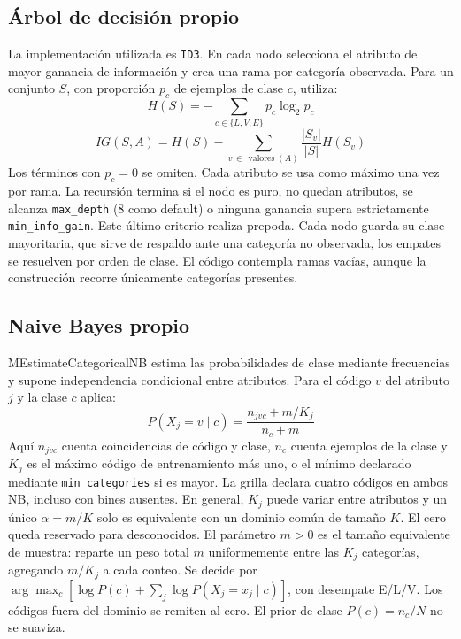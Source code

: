\documentclass[conference]{IEEEtran}
\begin{document}
\subsection{Árbol de decisión propio}
La implementación utilizada es \texttt{ID3}. En cada nodo selecciona el atributo de mayor ganancia de información y crea una rama por categoría observada. Para un conjunto $S$, con proporción $p_c$ de ejemplos de clase $c$, utiliza:
\begin{equation}
H(S) = -\sum_{c \in \{L,V,E\}} p_c \log_2 p_c
\label{eq:entropia}
\end{equation}
\begin{equation}
IG(S, A) = H(S) - \sum_{v \,\in\, \operatorname{valores}(A)} \frac{|S_v|}{|S|} H(S_v)
\label{eq:ganancia}
\end{equation}
Los términos con $p_c=0$ se omiten. Cada atributo se usa como máximo una vez por rama. La recursión termina si el nodo es puro, no quedan atributos, se alcanza \texttt{max\_depth} (8 como default) o ninguna ganancia supera estrictamente \texttt{min\_info\_gain}. Este último criterio realiza prepoda. Cada nodo guarda su clase mayoritaria, que sirve de respaldo ante una categoría no observada, los empates se resuelven por orden de clase. El código contempla ramas vacías, aunque la construcción recorre únicamente categorías presentes.

\subsection{Naive Bayes propio}
MEstimateCategoricalNB estima las probabilidades de clase mediante frecuencias y supone independencia condicional entre atributos. Para el código $v$ del atributo $j$ y la clase $c$ aplica:
\begin{equation}
P(X_j=v\mid c)=\frac{n_{jvc}+m/K_j}{n_c+m}
\label{eq:m-estimate}
\end{equation}
Aquí $n_{jvc}$ cuenta coincidencias de código y clase, $n_c$ cuenta ejemplos de la clase y $K_j$ es el máximo código de entrenamiento más uno, o el mínimo declarado mediante \texttt{min\_categories} si es mayor. La grilla declara cuatro códigos en ambos NB, incluso con bines ausentes. En general, $K_j$ puede variar entre atributos y un único $\alpha=m/K$ solo es equivalente con un dominio común de tamaño $K$. El cero queda reservado para desconocidos. El parámetro $m>0$ es el tamaño equivalente de muestra: reparte un peso total $m$ uniformemente entre las $K_j$ categorías, agregando $m/K_j$ a cada conteo. Se decide por $\arg\max_c[\log P(c)+\sum_j\log P(X_j=x_j\mid c)]$, con desempate E/L/V. Los códigos fuera del dominio se remiten al cero. El prior de clase $P(c)=n_c/N$ no se suaviza.
\end{document}
